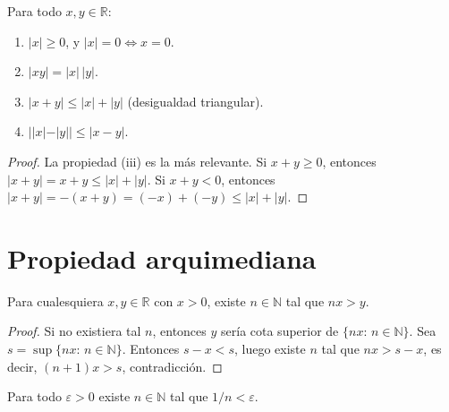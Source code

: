 \begin{proposition}
\label{prop:prop-abs}
Para todo $x,y\in\mathbb{R}$:
\begin{enumerate}
  \item[(i)] $|x|\geq 0$, y $|x|=0\Leftrightarrow x=0$.
  \item[(ii)] $|xy|=|x|\,|y|$.
  \item[(iii)] $|x+y|\leq |x|+|y|$ (desigualdad triangular).
  \item[(iv)] $||x|-|y||\leq |x-y|$.
\end{enumerate}
\end{proposition}

\begin{proof}
La propiedad (iii) es la más relevante. Si $x+y\geq 0$, entonces $|x+y|=x+y\leq|x|+|y|$. Si $x+y<0$, entonces $|x+y|=-(x+y)=(-x)+(-y)\leq|x|+|y|$.
\end{proof}

\section{Propiedad arquimediana}

\begin{theorem}
\label{teo:arquimediana}
Para cualesquiera $x,y\in\mathbb{R}$ con $x>0$, existe $n\in\mathbb{N}$ tal que $nx>y$.
\end{theorem}

\begin{proof}
Si no existiera tal $n$, entonces $y$ sería cota superior de $\{nx:\,n\in\mathbb{N}\}$. Sea $s=\sup\{nx:\,n\in\mathbb{N}\}$. Entonces $s-x<s$, luego existe $n$ tal que $nx>s-x$, es decir, $(n+1)x>s$, contradicción.
\end{proof}

\begin{center}
\end{center}

\begin{corollary}
\label{cor:racionales-densos-orden}
Para todo $\varepsilon>0$ existe $n\in\mathbb{N}$ tal que $1/n<\varepsilon$.
\end{corollary}

